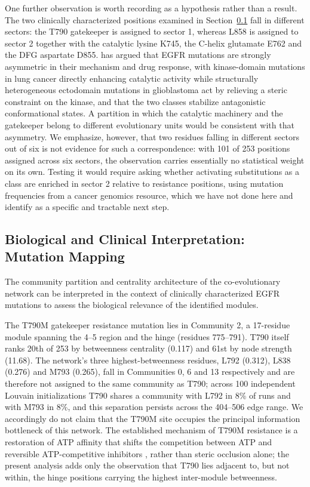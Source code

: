\documentclass[utf8]{FrontiersinHarvard}
\begin{document}
One further observation is worth recording as a hypothesis rather than a result. The two clinically characterized positions examined in Section~\ref{sec:mutationmapping} fall in different sectors: the T790 gatekeeper is assigned to sector 1, whereas L858 is assigned to sector 2 together with the catalytic lysine K745, the \textalpha{}C-helix glutamate E762 and the DFG aspartate D855. \citet{Orellana2025} has argued that EGFR mutations are strongly asymmetric in their mechanism and drug response, with kinase-domain mutations in lung cancer directly enhancing catalytic activity while structurally heterogeneous ectodomain mutations in glioblastoma act by relieving a steric constraint on the kinase, and that the two classes stabilize antagonistic conformational states. A partition in which the catalytic machinery and the gatekeeper belong to different evolutionary units would be consistent with that asymmetry. We emphasize, however, that two residues falling in different sectors out of six is not evidence for such a correspondence: with 101 of 253 positions assigned across six sectors, the observation carries essentially no statistical weight on its own. Testing it would require asking whether activating substitutions as a class are enriched in sector 2 relative to resistance positions, using mutation frequencies from a cancer genomics resource, which we have not done here and identify as a specific and tractable next step.

\subsection{Biological and Clinical Interpretation: Mutation Mapping}
\label{sec:mutationmapping}

The community partition and centrality architecture of the co-evolutionary network can be interpreted in the context of clinically characterized EGFR mutations to assess the biological relevance of the identified modules.

The T790M gatekeeper resistance mutation lies in Community 2, a 17-residue module spanning the \textbeta{}4--\textbeta{}5 region and the hinge (residues 775--791). T790 itself ranks 20th of 253 by betweenness centrality (0.117) and 61st by node strength (11.68). The network's three highest-betweenness residues, L792 (0.312), L838 (0.276) and M793 (0.265), fall in Communities 0, 6 and 13 respectively and are therefore not assigned to the same community as T790; across 100 independent Louvain initializations T790 shares a community with L792 in 8\% of runs and with M793 in 8\%, and this separation persists across the 404--506 edge range. We accordingly do not claim that the T790M site occupies the principal information bottleneck of this network. The established mechanism of T790M resistance is a restoration of ATP affinity that shifts the competition between ATP and reversible ATP-competitive inhibitors \citep{Yun2008}, rather than steric occlusion alone; the present analysis adds only the observation that T790 lies adjacent to, but not within, the hinge positions carrying the highest inter-module betweenness.
\end{document}
